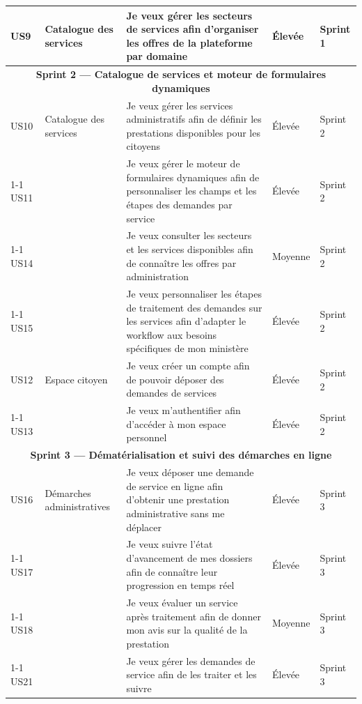 \begin{longtable}{|p{0.8cm}|p{2.5cm}|p{6.2cm}|p{1.5cm}|p{1.5cm}|}
US9  & Catalogue des services    & Je veux gérer les secteurs de services afin d'organiser les offres de la plateforme par domaine & Élevée & Sprint 1 \\ \hline

\multicolumn{5}{|c|}{\cellcolor{orange!15}\textbf{Sprint 2 — Catalogue de services 
et moteur de formulaires dynamiques}} \\ \hline

US10 & Catalogue des services
     & Je veux gérer les services administratifs afin de définir les prestations disponibles pour les citoyens & Élevée & Sprint 2 \\ \cline{1-1}\cline{3-5}
US11 & & Je veux gérer le moteur de formulaires dynamiques afin de personnaliser les champs et les étapes des demandes par service & Élevée & Sprint 2 \\ \cline{1-1}\cline{3-5}
US14 & & Je veux consulter les secteurs et les services disponibles afin de connaître les offres par administration & Moyenne & Sprint 2 \\ \cline{1-1}\cline{3-5}
US15 & & Je veux personnaliser les étapes de traitement des demandes sur les services afin d'adapter le workflow aux besoins spécifiques de mon ministère & Élevée & Sprint 2 \\ \hline

US12 & Espace citoyen
     & Je veux créer un compte afin de pouvoir déposer des demandes de services & Élevée & Sprint 2 \\ \cline{1-1}\cline{3-5}
US13 & & Je veux m'authentifier afin d'accéder à mon espace personnel & Élevée & Sprint 2 \\ \hline

\multicolumn{5}{|c|}{\cellcolor{orange!15}\textbf{Sprint 3 — Dématérialisation 
et suivi des démarches en ligne}} \\ \hline

US16 & Démarches administratives
     & Je veux déposer une demande de service en ligne afin d'obtenir une prestation administrative sans me déplacer & Élevée & Sprint 3 \\ \cline{1-1}\cline{3-5}
US17 & & Je veux suivre l'état d'avancement de mes dossiers afin de connaître leur progression en temps réel & Élevée & Sprint 3 \\ \cline{1-1}\cline{3-5}
US18 & & Je veux évaluer un service après traitement afin de donner mon avis sur la qualité de la prestation & Moyenne & Sprint 3 \\ \cline{1-1}\cline{3-5}
US21 & & Je veux gérer les demandes de service afin de les traiter et les suivre & Élevée & Sprint 3 \\ \hline


\end{longtable}
